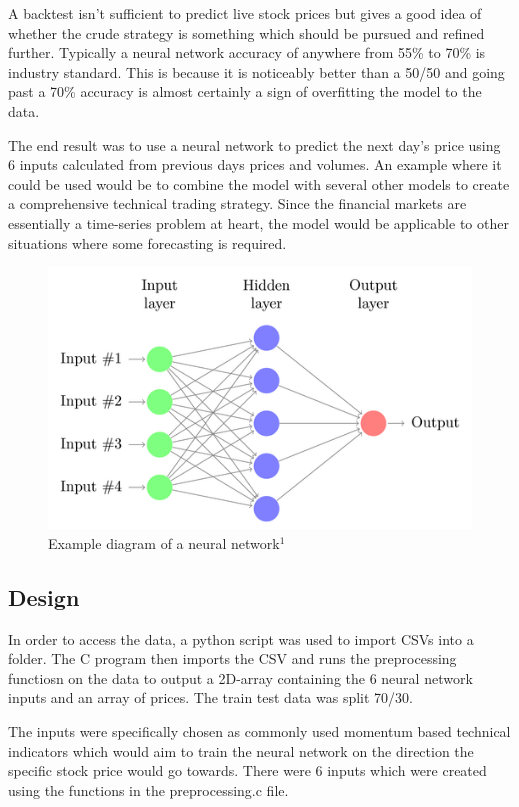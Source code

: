 \documentclass[11pt]{article}
\begin{document}
A backtest isn't sufficient to predict live stock prices but gives a good idea of whether the crude strategy is something which should be pursued and refined further. Typically a neural network accuracy of anywhere from 55\% to 70\% is industry standard. This is because it is noticeably better than a 50/50 and going past a 70\% accuracy is almost certainly a sign of overfitting the model to the data.

The end result was to use a neural network to predict the next day's price using 6 inputs calculated from previous days prices and volumes. An example where it could be used would be to combine the model with several other models to create a comprehensive technical trading strategy. Since the financial markets are essentially a time-series problem at heart, the model would be applicable to other situations where some forecasting is required.

\begin{figure}[h]
\includegraphics[scale=0.8]{neural-network}
\caption{Example diagram of a neural network$^1$}
\end{figure}

\subsection{Design}
In order to access the data, a python script was used to import CSVs into a folder. The C program then imports the CSV and runs the preprocessing functiosn on the data to output a 2D-array containing the 6 neural network inputs and an array of prices. The train test data was split 70/30.

The inputs were specifically chosen as commonly used momentum based technical indicators which would aim to train the neural network on the direction the specific stock price would go towards. There were 6 inputs which were created using the functions in the preprocessing.c file. 
\end{document}
